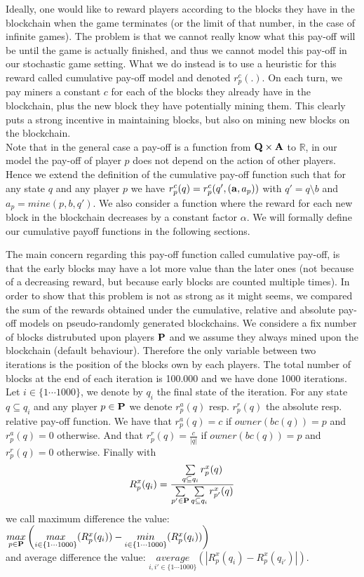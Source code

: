 \begin{myex}
\end{myex} 

Ideally, one would like to reward players according to the blocks they have in the blockchain when the game terminates (or the limit of that number, in the case of infinite games). The problem is that we cannot really know what this pay-off will be until the game is actually finished, and thus we cannot model this pay-off in our stochastic game setting. 
What we do instead is to use a heuristic for this reward called cumulative pay-off model and denoted $r_p^c(.)$. On each turn, we pay miners a constant $c$ for each of the blocks they already have in the blockchain, plus the new block they have potentially mining them. This clearly puts a strong incentive in maintaining blocks, but also on mining new blocks on the blockchain. 
\\Note that in the general case a pay-off is a function from $\mathbf{Q} \times \mathbf{A}$ to $\mathbb{R}$, in our model the pay-off of player $p$ does not depend on the action of other players. Hence we extend the definition of the cumulative pay-off function such that for any state $q$ and any player $p$ we have $r_p^c(q) = r_p^c(q',(\mathbf{a},a_p))$ with $q' = q \setminus b$ and $a_p = mine(p,b,q')$. We also consider a function where the reward for each new block in the blockchain decreases by a constant factor $\alpha$. We will formally define our cumulative payoff functions in the following sections. 


The main concern regarding this pay-off function called cumulative pay-off, is that the early blocks may have a lot more value than the later ones (not because of a decreasing reward, but because early blocks are counted multiple times).
In order to show that this problem is not as strong as it might seems, we compared the sum of the rewards obtained under the cumulative, relative \cite{} and absolute \cite{} pay-off models on pseudo-randomly generated  blockchains. We considere a fix number of blocks distrubuted upon players $\mathbf{P}$ and we assume they always mined upon the blockchain (default behaviour). Therefore the only variable between two iterations is the position of the blocks own by each players. The total number of blocks at the end of each iteration is 100.000 and we have done 1000 iterations. Let $i \in \{1\cdots 1000\}$, we denote by $q_i$ the final state of the iteration. For any state $q \subseteq q_i$ and any player $p \in \mathbf{P}$ we denote $r_p^a(q)$ resp. $r_p^r(q)$ the absolute resp. relative pay-off function. We have that $r_p^a(q) = c$ if $owner(bc(q)) = p$ and $r_p^a(q) = 0$ otherwise. And that $r_p^r(q) = \frac{c}{|q|}$ if $owner(bc(q)) = p$ and $r_p^r(q) = 0$ otherwise. Finally with $$R_p^x(q_i) = \frac{\sum\limits_{q \subseteq q_i} r_p^x(q)}{\sum\limits_{p' \in \mathbf{P}}\sum\limits_{q \subseteq q_i} r_{p'}^x(q)} $$ we call maximum difference the value:\\ $\underset{p \in \mathbf{P}}{max}\left(\underset{{i \in \{1 \cdots 10
00\}}}{max}(R_p^x(q_i)) - \underset{{i \in \{1 \cdots 10
00\}}}{min}(R_p^x(q_i))\right)$\\and average difference the value: $\underset{{i,i' \in \{1 \cdots 10
00\}}}{average}(|R_p^x(q_i) - R_p^x(q_{i'})|) $.

